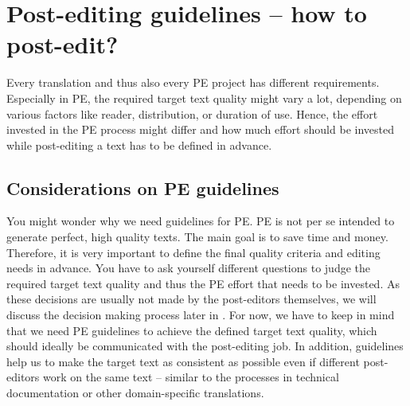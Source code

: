 \chapter{Post-editing guidelines -- how to post-edit?}\label{sec:4}



\vspace{\baselineskip}

Every translation and thus also every PE project has different requirements. Especially in PE, the required target text quality might vary a lot, depending on various factors like reader, distribution, or duration of use. Hence, the effort invested in the PE process might differ and how much effort should be invested while post-editing a text has to be defined in advance. 

\section{Considerations on PE guidelines}\label{sec:4:1}

You might wonder why we need guidelines for PE. PE is not per se intended to generate perfect, high quality texts. The main goal is to save time and money. Therefore, it is very important to define the final quality criteria and editing needs in advance. You have to ask yourself different questions to judge the required target text quality and thus the PE effort that needs to be invested. As these decisions are usually not made by the post-editors themselves, we will discuss the decision making process later in . For now, we have to keep in mind that we need PE guidelines to achieve the defined target text quality, which should ideally be communicated with the post-editing job. In addition, guidelines help us to make the target text as consistent as possible even if different post-editors work on the same text -- similar to the processes in technical documentation or other domain-specific translations. 

